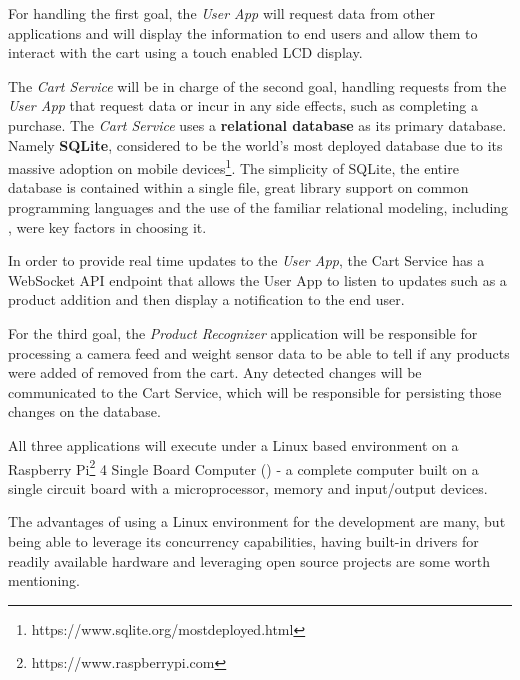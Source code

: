 \documentclass[openright]{normas-utf-tex} %
\begin{document}
For handling the first goal, the \textit{User App} will request data
from other applications and will display the information to end users and allow
them to interact with the cart using a touch enabled LCD display. 

The \textit{Cart Service} will be in charge of the second goal,
handling requests from the \textit{User App} that request data or incur in any
side effects, such as completing a purchase. The \textit{Cart Service} uses a
\textbf{relational database} \cite{Silberschatz2010} as its primary database. Namely
\textbf{SQLite}, considered to be the world's most deployed database due to its
massive adoption on mobile
devices\footnote{https://www.sqlite.org/mostdeployed.html}. The simplicity of
SQLite, the entire database is contained within a single file, great
library support on common programming languages and the use of the familiar
relational modeling, including 
\cite{Nield2016}, were key factors in choosing it.

In order to provide real time updates to the \textit{User App}, the Cart Service has a
WebSocket API endpoint that allows the User App to listen to updates such as a product addition
and then display a notification to the end user.

For the third goal, the \textit{Product Recognizer} application will be responsible
for processing a camera feed and weight sensor data to be able to tell if any products
were added of removed from the cart. Any detected changes will be communicated to the
Cart Service, which will be responsible for persisting those changes on the database. 

All three applications will execute under a Linux \cite{Tanenbaum2015} 
based environment on a Raspberry Pi\footnote{https://www.raspberrypi.com} 4 Single Board
Computer () - a complete computer built on a single 
circuit board with a microprocessor, memory and input/output devices.

The advantages of using a Linux environment for the development are many, but
being able to leverage its concurrency capabilities, having built-in drivers
for readily available hardware and leveraging open source projects are some 
worth mentioning.
\end{document}
